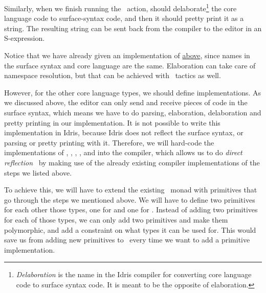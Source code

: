 Similarly, when we finish running the \Elab\ action,  should
delaborate\footnote{\emph{Delaboration} is the name in the Idris compiler for
converting core language code to surface syntax code. It is meant to be the
opposite of elaboration.} the core language code to surface-syntax code, and
then it should pretty print it as a string. The resulting string can be sent
back from the compiler to the editor in an S-expression.


Notice that we have already given an  implementation of
 \hyperref[code:ttnameEditorable]{above}, since names in the
surface syntax and core language are the same. Elaboration can take care of
namespace resolution, but that can be achieved with \Elab\ tactics as well.

However, for the other core language types, we should define 
implementations. As we discussed above, the editor can only send and receive
pieces of code in the surface syntax, which means we have to do parsing,
elaboration, delaboration and pretty printing in our 
implementation.
It is not possible to write this implementation in Idris,
because Idris does not reflect the surface syntax, or parsing or pretty
printing with it.
Therefore, we will hard-code the implementations of , ,
, , and  into the compiler,
which allows us to do \emph{direct reflection}~\cite{barzilayphd} by making use
of the already existing compiler implementations of the steps we listed above.

To achieve this, we will have to extend the existing \Elab\ monad with
primitives that go through the steps we mentioned above. We will have to define
two primitives for each other those types, one for  and one for
. Instead of adding two primitives for each of those types, we can
only add two primitives and make them polymorphic, and add a constraint on what
types it can be used for. This would save us from adding new primitives to
\Elab\ every time we want to add a primitive  implementation.

